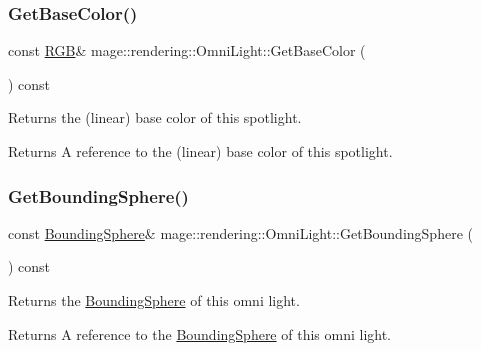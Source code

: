 \subsubsection{\texorpdfstring{Get\+Base\+Color()}{GetBaseColor()}\hspace{0.1cm}{\footnotesize\ttfamily [2/2]}}
{\footnotesize\ttfamily const \hyperlink{structmage_1_1_r_g_b}{R\+GB}\& mage\+::rendering\+::\+Omni\+Light\+::\+Get\+Base\+Color (\begin{DoxyParamCaption}{ }\end{DoxyParamCaption}) const\hspace{0.3cm}{\ttfamily [noexcept]}}

Returns the (linear) base color of this spotlight.

\begin{DoxyReturn}{Returns}
A reference to the (linear) base color of this spotlight. 
\end{DoxyReturn}
\hypertarget{classmage_1_1rendering_1_1_omni_light_aaecee74a14aae5015f8bc738727162ee}{}\label{classmage_1_1rendering_1_1_omni_light_aaecee74a14aae5015f8bc738727162ee} 
\subsubsection{\texorpdfstring{Get\+Bounding\+Sphere()}{GetBoundingSphere()}}
{\footnotesize\ttfamily const \hyperlink{classmage_1_1_bounding_sphere}{Bounding\+Sphere}\& mage\+::rendering\+::\+Omni\+Light\+::\+Get\+Bounding\+Sphere (\begin{DoxyParamCaption}{ }\end{DoxyParamCaption}) const\hspace{0.3cm}{\ttfamily [noexcept]}}

Returns the \hyperlink{classmage_1_1_bounding_sphere}{Bounding\+Sphere} of this omni light.

\begin{DoxyReturn}{Returns}
A reference to the \hyperlink{classmage_1_1_bounding_sphere}{Bounding\+Sphere} of this omni light. 
\end{DoxyReturn}
\hypertarget{classmage_1_1rendering_1_1_omni_light_a30b6cbf1fd7a6058856a491c2ce75005}{}\label{classmage_1_1rendering_1_1_omni_light_a30b6cbf1fd7a6058856a491c2ce75005} 
